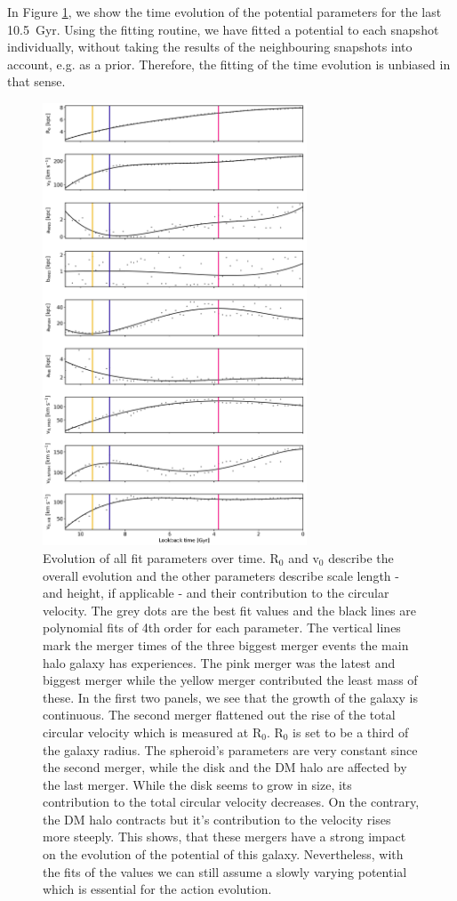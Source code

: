 In Figure \ref{fig:pot_val_evol}, we show the time evolution of the potential parameters for the last \SI{10.5}{Gyr}. Using the fitting routine, we have fitted a potential to each snapshot individually, without taking the results of the neighbouring snapshots into account, e.g. as a prior. Therefore, the fitting of the time evolution is unbiased in that sense. 
\begin{figure}%
\captionsetup{format=plain}
\centering
\includegraphics[width=0.7\textwidth]{plots/Auriga/fitted_potential_evolution_dec18.png}
\caption{Evolution of all fit parameters over time. R$_0$ and v$_0$ describe the overall evolution and the other parameters describe scale length - and height, if applicable - and their contribution to the circular velocity. The grey dots are the best fit values and the black lines are polynomial fits of 4th order for each parameter. The vertical lines mark the merger times of the three biggest merger events the main halo galaxy has experiences. The pink merger was the latest and biggest merger while the yellow merger contributed the least mass of these. In the first two panels, we see that the growth of the galaxy is continuous. The second merger flattened out the rise of the total circular velocity which is measured at R$_0$. R$_0$ is set to be a third of the galaxy radius. The spheroid's parameters are very constant since the second merger, while the disk and the \ac{DM} halo are affected by the last merger. While the disk seems to grow in size, its contribution to the total circular velocity decreases. On the contrary, the \ac{DM} halo contracts but it's contribution to the velocity rises more steeply. This shows, that these mergers have a strong impact on the evolution of the potential of this galaxy. Nevertheless, with the fits of the values we can still assume a slowly varying potential which is essential for the action evolution.}\label{fig:pot_val_evol}

\end{figure}
